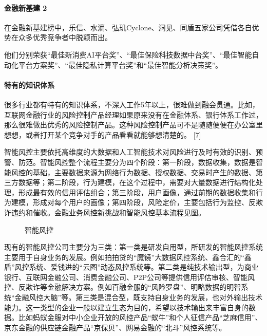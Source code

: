 \documentclass[letterpaper,11pt,english]{sphinxmanual}
\begin{document}
\paragraph{金融新基建 2\sphinxfootnotemark[680]}
\label{\detokenize{chapter_project/AI_Finance:id10}}%
\begin{footnotetext}[680]\sphinxAtStartFootnote
{}
%
\end{footnotetext}\ignorespaces 
在金融新基建榜中，乐信、水滴、弘玑Cyclone、洞见、同盾五家公司凭借各自优势在众多优秀竞争者中脱颖而出。

他们分别荣获“最佳新消费AI平台奖”、“最佳保险科技数据中台奖”、“最佳智能自动化平台方案奖”、“最佳隐私计算平台奖”和“最佳智能分析决策奖”。


\paragraph{特有的知识体系}
\label{\detokenize{chapter_project/AI_Finance:id11}}
很多行业都有特有的知识体系，不深入工作5年以上，很难做到融会贯通。比如，互联网金融行业的风险控制产品经理如果原来没有在金融体系、银行体系工作过，那么很难做出优秀的风险控制产品。这种风险控制产品可不是随随便便在办公室里想想，或者打开某个竞争对手的产品看看就能够想清楚的。
{[}7{]}

智能风控主要依托高维度的大数据和人工智能技术对风险进行及时有效的识别、预警、防范。智能风控整个流程主要分为四个阶段：第一阶段，数据收集，数据是智能风控的基础，主要数据来源为网络行为数据、授权数据、交易时产生的数据、第三方数据等；第二阶段，行为建模，在这个过程中，需要对大量数据进行结构化处理，形成最有效的信用评估组合；第三阶段，用户画像，通过前期的数据收集和行为建模，形成对每个用户的画像；第四阶段，风险定价，主要包括行为监控、反欺诈违约和催收。金融业务风控新挑战和智能风控基本流程见图。

\begin{figure}[H]
\centering
\capstart

\noindent{}
\caption{智能风控}\label{\detokenize{chapter_project/AI_Finance:id35}}\end{figure}

现有的智能风控公司主要分为三类：第一类是研发自用型，所研发的智能风控系统主要用于自身业务的发展。例如拍拍贷的“魔镜”大数据风控系统、鑫合汇的“鑫盾”风控系统、爱钱进的“云图”动态风控系统等。第二类是纯技术输出型，为商业银行、互联网金融公司、消费金融公司、P2P公司等提供信用评估审核、智能风控、反欺诈等金融解决方案。例如百融金服的“风险罗盘”、明略数据的明智系统“金融风控大脑”等。第三类是混合型，既支持自身业务的发展，也对外输出技术能力。这一类型的企业一般以建立生态为目的，希望以技术输出来丰富自身的数据。比如蚂蚁金服对中小企业开放的风控产品“蚁牛”和个人征信产品“芝麻信用”、京东金融的供应链金融产品“京保贝”、网易金融的“北斗”风控系统等。
\end{document}
